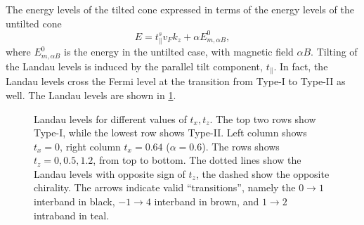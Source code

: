 The energy levels of the tilted cone expressed in terms of the energy levels of the untilted cone
\[
E = t^s_{\parallel} v_F k_z + \alpha E^0_{m, \alpha B},
\]
where \( E^0_{m, \alpha B} \) is the energy in the untilted case, with magnetic field \( \alpha B \).
Tilting of the Landau levels is induced by the parallel tilt component, \( t_\parallel \).
In fact, the Landau levels cross the Fermi level at the transition from Type-I to Type-II as well.
The Landau levels are shown in \cref{fig:llevelstilt}.


\begin{figure}[p!]
  \centering
  \resizebox{\textwidth}{!}{
  
  }
  \caption{\label{fig:llevelstilt}Landau levels for different values of \( t_x, t_z \).
    The top two rows show Type-I, while the lowest row shows Type-II.
    Left column shows \( t_x = 0 \), right column \( t_x = 0.64 \) (\( \alpha = 0.6 \)).
    The rows shows \( t_z = 0, 0.5, 1.2 \), from top to bottom.
    The dotted lines show the Landau levels with opposite sign of \( t_z \), the dashed show the opposite chirality.
    The arrows indicate valid ``transitions'', namely the \( 0\to 1 \) interband in black, \( -1 \to 4 \) interband in \textcolor{brown!70!black}{brown}, and \( 1\to 2 \) intraband in \textcolor{teal!70!black}{teal}.
  }
\end{figure}

